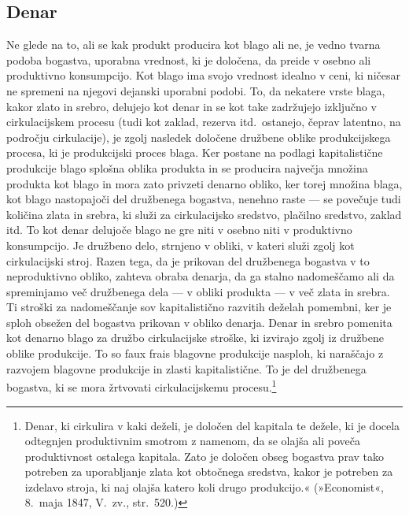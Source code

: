 \documentclass[kapital_02.tex]{subfiles}
\begin{document}
\subsection{Denar}
Ne glede na to, ali se kak produkt producira kot blago ali ne, je vedno tvarna podoba bogastva, uporabna vrednost, ki je določena, da preide v osebno ali produktivno konsumpcijo.
Kot blago ima svojo vrednost idealno v ceni, ki ničesar ne spremeni na njegovi dejanski uporabni podobi.
To, da nekatere vrste blaga, kakor zlato in srebro, delujejo kot denar in se kot take zadržujejo izključno v cirkulacijskem procesu (tudi kot zaklad, rezerva itd.\ ostanejo, čeprav latentno, na področju cirkulacije), je zgolj nasledek določene družbene oblike produkcijskega procesa, ki je produkcijski proces blaga.
Ker postane na podlagi kapitalistične produkcije blago splošna oblika produkta in se producira največja množina produkta kot blago in mora zato privzeti denarno obliko, ker torej množina blaga, kot blago nastopajoči del družbenega bogastva, nenehno raste — se povečuje tudi količina zlata in srebra, ki služi za cirkulacijsko sredstvo, plačilno sredstvo, zaklad itd.
To kot denar delujoče blago ne gre niti v osebno niti v produktivno konsumpcijo.
Je družbeno delo, strnjeno v obliki, v kateri služi zgolj kot cirkulacijski stroj.
Razen tega, da je prikovan del družbenega bogastva v to neproduktivno obliko, zahteva obraba denarja, da ga stalno nadomeščamo ali da spreminjamo več družbenega dela — v obliki produkta — v več zlata in srebra.
Ti stroški za nadomeščanje so\KPEstran v kapitalistično razvitih deželah pomembni, ker je sploh obsežen del bogastva prikovan v obliko denarja.
Denar in srebro pomenita kot denarno blago za družbo cirkulacijske stroške, ki izvirajo zgolj iz družbene oblike produkcije.
To so faux frais blagovne produkcije nasploh, ki naraščajo z razvojem blagovne produkcije in zlasti kapitalistične.
To je del družbenega bogastva, ki se mora žrtvovati cirkulacijskemu procesu.\footnote
{Denar, ki cirkulira v kaki deželi, je določen del kapitala te dežele, ki je docela odtegnjen produktivnim smotrom z namenom, da se olajša ali poveča produktivnost ostalega kapitala.
Zato je določen obseg bogastva prav tako potreben za uporabljanje zlata kot obtočnega sredstva, kakor je potreben za izdelavo stroja, ki naj olajša katero koli drugo produkcijo.« (»Economist«, 8.\ maja 1847, V.\ zv., str.\ 520.)}
\end{document}
